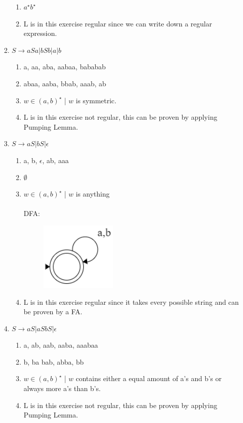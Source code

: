 \documentclass{article}
\begin{document}
\begin{enumerate}
\begin{enumerate}[label=(\alph*)]
\begin{enumerate}
		 		\item $a^{\star}b^{\star}$
		 		\item L is in this exercise regular since we can write down a regular expression.
		 	\end{enumerate}
		 	\item $S \rightarrow aSa|bSb|a|b$
		 	\begin{enumerate}
		 		\item a, aa, aba, aabaa, bababab
		 		\item abaa, aaba, bbab, aaab, ab
		 		\item $w \in (a, b)^\star$ | $w$ is symmetric. 
		 		\item L is in this exercise not regular, this can be proven by applying Pumping Lemma.
		 	\end{enumerate}
		 	\item $S \rightarrow aS|bS|\epsilon$
		 	\begin{enumerate}
		 		\item a, b, $\epsilon$, ab, aaa
		 		\item $\emptyset$
		 		\item $w \in (a, b)^\star$ | $w$ is anything\\~\\DFA:
					\begin{figure}[H]
						\centering
						\includegraphics{7cc}
						\caption{}
						\label{fig:7cc}
					\end{figure}
		 		\item L is in this exercise regular since it takes every possible string and can be proven by a FA.
		 	\end{enumerate}
		 	\item $S \rightarrow aS|aSbS|\epsilon$
		 	\begin{enumerate}
		 		\item a, ab, aab, aaba, aaabaa
		 		\item b, ba bab, abba, bb
		 		\item $w \in (a, b)^\star$ | $w$ contains either a equal amount of a's and b's or always more a's than b's. 
		 		\item L is in this exercise not regular, this can be proven by applying Pumping Lemma.

\end{enumerate}
\end{enumerate}
\end{enumerate}
\end{document}
